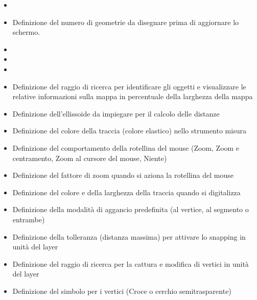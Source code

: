 
\begin{itemize}
\item {}
\item Definizione del numero di geometrie da disegnare prima di aggiornare lo
schermo.
\item {}
\item {}
\item {} 
\end{itemize}


\begin{itemize}
\item Definizione del raggio di ricerca per identificare gli oggetti e
visualizzare le relative informazioni sulla mappa in percentuale della
larghezza della mappa
\item Definizione dell'ellissoide da impiegare per il calcolo delle distanze
\item Definizione del colore della traccia (colore elastico) nello strumento
misura
\item Definizione del comportamento della rotellina del mouse (Zoom, Zoom e
centramento, Zoom al cursore del mouse, Niente)
\item Definizione del fattore di zoom quando si aziona la rotellina del mouse
\end{itemize}


\begin{itemize}
\item Definizione del colore e della larghezza della traccia quando si digitalizza
\item Definizione della modalità di aggancio predefinita (al vertice, al
segmento o entrambe)
\item Definizione della tolleranza (distanza massima) per attivare lo snapping
in unità del layer
\item Definizione del raggio di ricerca per la cattura e modifica di vertici
in unità del layer
\item Definizione del simbolo per i vertici (Croce o cerchio semitrasparente)
\end{itemize}

